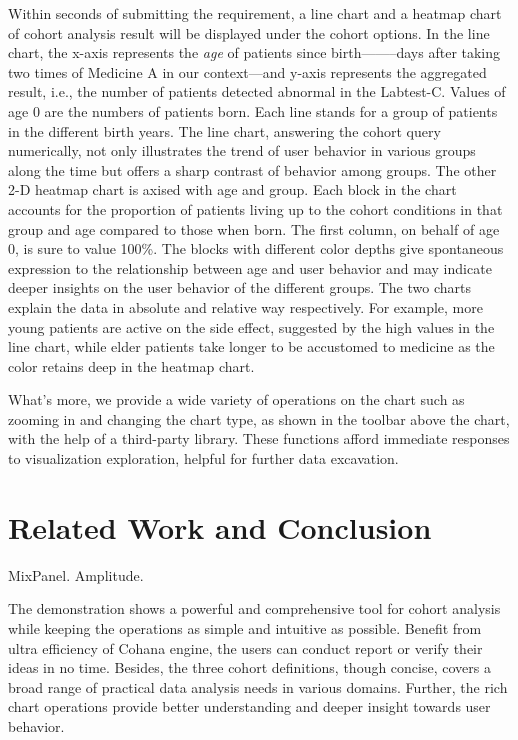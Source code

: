 \documentclass[10pt,conference,letterpaper]{IEEEtran}
\begin{document}
Within seconds of submitting the requirement, a line chart and a heatmap chart of cohort analysis result will be displayed under the cohort options. In the line chart, the x-axis represents the \emph{age} of patients since birth——--days after taking two times of Medicine A in our context---and y-axis represents the aggregated result, i.e., the number of patients detected abnormal in the Labtest-C. Values of age 0 are the numbers of patients born. Each line stands for a group of patients in the different birth years. The line chart, answering the cohort query numerically, not only illustrates the trend of user behavior in various groups along the time but offers a sharp contrast of behavior among groups. The other 2-D heatmap chart is axised with age and group. Each block in the chart accounts for the proportion of patients living up to the cohort conditions in that group and age compared to those when born. The first column, on behalf of age 0, is sure to value 100\%. The blocks with different color depths give spontaneous expression to the relationship between age and user behavior and may indicate deeper insights on the user behavior of the different groups. The two charts explain the data in absolute and relative way respectively. For example, more young patients are active on the side effect, suggested by the high values in the line chart, while elder patients take longer to be accustomed to medicine as the color retains deep in the heatmap chart.

What's more, we provide a wide variety of operations on the chart such as zooming in and changing the chart type, as shown in the toolbar above the chart, with the help of a third-party library. These functions afford immediate responses to visualization exploration, helpful for further data excavation.

\section{Related Work and Conclusion}

MixPanel. Amplitude. 

The demonstration shows a powerful and comprehensive tool for cohort analysis while keeping the operations as simple and intuitive as possible. Benefit from ultra efficiency of Cohana engine, the users can conduct report or verify their ideas in no time. Besides, the three cohort definitions, though concise, covers a broad range of practical data analysis needs in various domains. Further, the rich chart operations provide better understanding and deeper insight towards user behavior.







\end{document}
